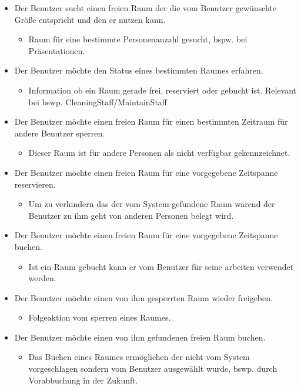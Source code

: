 \begin{itemize}
\begin{itemize}[noitemsep]
\begin{itemize}
		\end{itemize}
		\item Der Benutzer sucht einen freien Raum der die vom Benutzer gewünschte Größe entspricht und den er nutzen kann.
		\begin{itemize}
			\item Raum für eine bestimmte Personenanzahl gesucht, bspw. bei Präsentationen. 
		\end{itemize}
		\item Der Benutzer möchte den Status eines bestimmten Raumes erfahren. 
		\begin{itemize}
			\item Information ob ein Raum gerade frei, reserviert oder gebucht ist. Relevant bei bswp. CleaningStaff/MaintainStaff
		\end{itemize}
		\item Der Benutzer möchte einen freien Raum für einen bestimmten Zeitraum für andere Benutzer sperren.
		\begin{itemize}
			\item Dieser Raum ist für andere Personen als nicht verfügbar gekennzeichnet.
		\end{itemize}
		\item Der Benutzer möchte einen freien Raum für eine vorgegebene Zeitspanne reservieren.
		\begin{itemize}
			\item Um zu verhindern das der vom System gefundene Raum wärend der Benutzer zu ihm geht von anderen Personen belegt wird.
		\end{itemize}
		\item Der Benutzer möchte einen freien Raum für eine vorgegebene Zeitspanne buchen.
		\begin{itemize}
			\item Ist ein Raum gebucht kann er vom Benutzer für seine arbeiten verwendet werden.
		\end{itemize}
		\item Der Benutzer möchte einen von ihm gesperrten Raum wieder freigeben.
		\begin{itemize}
			\item Folgeaktion vom sperren eines Raumes.
		\end{itemize}
		\item Der Benutzer möchte einen von ihm gefundenen freien Raum buchen.
		\begin{itemize}
			\item Das Buchen eines Raumes ermöglichen der nicht vom System vorgeschlagen sondern vom Benutzer ausgewählt wurde, bswp. durch Vorabbuchung in der Zukunft.

\end{itemize}
\end{itemize}
\end{itemize}
